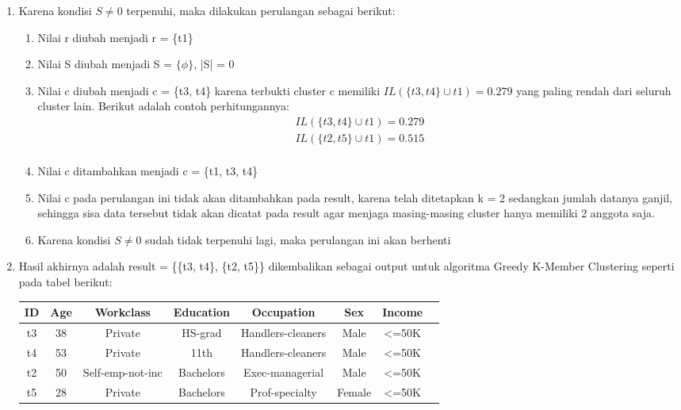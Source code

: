 \begin{enumerate}
\begin{enumerate}
\end{enumerate}

\item Karena kondisi $S \neq 0$ terpenuhi, maka dilakukan perulangan sebagai berikut:

\begin{enumerate}
\item Nilai r diubah menjadi r = \{t1\}
\item Nilai S diubah menjadi S = $\{\phi\}$, |S| = 0
\item Nilai c diubah menjadi c = \{t3, t4\} karena terbukti cluster c memiliki $IL(\{t3,t4\} \cup t1)=0.279$ yang paling rendah dari seluruh cluster lain. Berikut adalah contoh perhitungannya:
\begin{align*}
IL(\{t3,t4\} \cup t1) = 0.279 \\
IL(\{t2,t5\}\cup t1) = 0.515 \\
\end{align*}
\item Nilai c ditambahkan menjadi c = \{t1, t3, t4\}
\item Nilai c pada perulangan ini tidak akan ditambahkan pada result, karena telah ditetapkan k = 2 sedangkan jumlah datanya ganjil, sehingga sisa data tersebut tidak akan dicatat pada result agar menjaga masing-masing cluster hanya memiliki 2 anggota saja.
\item Karena kondisi $S \neq 0$ sudah tidak terpenuhi lagi, maka perulangan ini akan berhenti

\end{enumerate}

\item Hasil akhirnya adalah result = \{\{t3, t4\}, \{t2, t5\}\} dikembalikan sebagai output untuk algoritma Greedy K-Member Clustering seperti pada tabel berikut:\\

\begin{tabular}{c c c c c c c c}
\hline 
ID & Age & Workclass & Education & Occupation & Sex & Income\\ 
\hline 
t3 & 38 & Private & HS-grad & Handlers-cleaners & Male & <=50K  \\ 
t4 & 53 & Private & 11th & Handlers-cleaners & Male & <=50K  \\ 
\hline 
t2 & 50 & Self-emp-not-inc & Bachelors & Exec-managerial & Male & <=50K  \\ 
t5 & 28 & Private & Bachelors & Prof-specialty & Female & <=50K	 \\ 
\hline 
\end{tabular} 

\end{enumerate}

